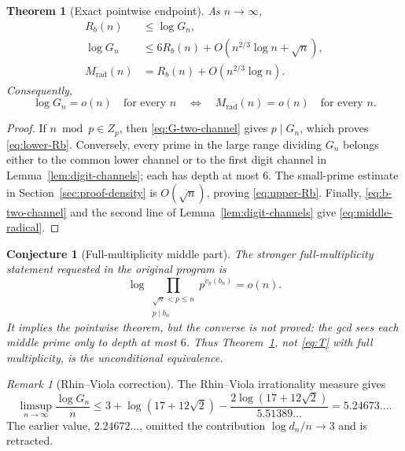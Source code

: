 \documentclass[11pt]{amsart}
\theoremstyle{plain}
\newtheorem{theorem}{Theorem}
\newtheorem{conjecture}{Conjecture}
\theoremstyle{remark}
\newtheorem{remark}{Remark}
\begin{document}
\begin{theorem}[Exact pointwise endpoint]\label{thm:pointwise-reduction}
As $n\to\infty$,
\begin{align}
 R_b(n)
 &\leq\log G_n,
 \label{eq:lower-Rb}\\
 \log G_n
 &\leq6R_b(n)+O(n^{2/3}\log n+\sqrt n),
 \label{eq:upper-Rb}\\
 M_{\mathrm{rad}}(n)
 &=R_b(n)+O(n^{2/3}\log n).
 \label{eq:middle-radical}
\end{align}
Consequently,
\[
 \log G_n=o(n)\quad\text{for every $n$}
 \quad\Longleftrightarrow\quad
 M_{\mathrm{rad}}(n)=o(n)\quad\text{for every $n$}.
\]
\end{theorem}

\begin{proof}
If $n\bmod p\in Z_p$, then \eqref{eq:G-two-channel} gives $p\mid G_n$,
which proves \eqref{eq:lower-Rb}.  Conversely, every prime in the large
range dividing $G_n$ belongs either to the common lower channel or to the
first digit channel in Lemma~\ref{lem:digit-channels}; each has depth at
most $6$.  The small-prime estimate in
Section~\ref{sec:proof-density} is $O(\sqrt n)$, proving
\eqref{eq:upper-Rb}.  Finally, \eqref{eq:b-two-channel} and the second
line of Lemma~\ref{lem:digit-channels} give
\eqref{eq:middle-radical}.
\end{proof}

\begin{conjecture}[Full-multiplicity middle part]
The stronger full-multiplicity statement requested in the original
program is
\begin{equation}
 \log\prod_{\substack{\sqrt n<p\leq n\\p\mid b_n}}
 p^{v_p(b_n)}=o(n).
 \tag{T}\label{eq:T}
\end{equation}
It implies the pointwise theorem, but the converse is not proved: the gcd
sees each middle prime only to depth at most $6$.  Thus
Theorem~\ref{thm:pointwise-reduction}, not \eqref{eq:T} with full
multiplicity, is the unconditional equivalence.
\end{conjecture}

\begin{remark}[Rhin--Viola correction]
The Rhin--Viola irrationality measure \cite{RhinViola2001} gives
\[
 \limsup_{n\to\infty}\frac{\log G_n}{n}
 \leq 3+\log(17+12\sqrt2)
 -\frac{2\log(17+12\sqrt2)}{5.51389\ldots}
 =5.24673\ldots.
\]
The earlier value, $2.24672\ldots$, omitted the contribution
$\log d_n/n\to3$ and is retracted.
\end{remark}
\end{document}
